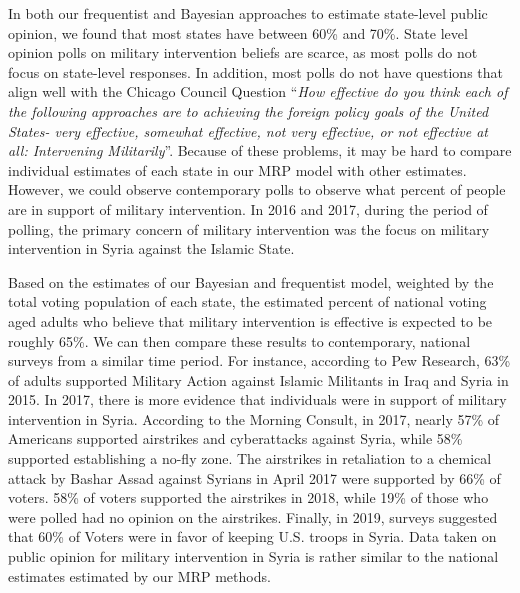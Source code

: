 \documentclass[
  11pt,
]{article}
\begin{document}
In both our frequentist and Bayesian approaches to estimate state-level
public opinion, we found that most states have between 60\% and 70\%.
State level opinion polls on military intervention beliefs are scarce,
as most polls do not focus on state-level responses. In addition, most
polls do not have questions that align well with the Chicago Council
Question ``\emph{How effective do you think each of the following
approaches are to achieving the foreign policy goals of the United
States- very effective, somewhat effective, not very effective, or not
effective at all: Intervening Militarily}''. Because of these problems,
it may be hard to compare individual estimates of each state in our MRP
model with other estimates. However, we could observe contemporary polls
to observe what percent of people are in support of military
intervention. In 2016 and 2017, during the period of polling, the
primary concern of military intervention was the focus on military
intervention in Syria against the Islamic State.

Based on the estimates of our Bayesian and frequentist model, weighted
by the total voting population of each state, the estimated percent of
national voting aged adults who believe that military intervention is
effective is expected to be roughly 65\%. We can then compare these
results to contemporary, national surveys from a similar time period.
For instance, according to Pew Research, 63\% of adults supported
Military Action against Islamic Militants in Iraq and Syria in 2015. In
2017, there is more evidence that individuals were in support of
military intervention in Syria. According to the Morning Consult, in
2017, nearly 57\% of Americans supported airstrikes and cyberattacks
against Syria, while 58\% supported establishing a no-fly zone. The
airstrikes in retaliation to a chemical attack by Bashar Assad against
Syrians in April 2017 were supported by 66\% of voters. 58\% of voters
supported the airstrikes in 2018, while 19\% of those who were polled
had no opinion on the airstrikes. Finally, in 2019, surveys suggested
that 60\% of Voters were in favor of keeping U.S. troops in Syria. Data
taken on public opinion for military intervention in Syria is rather
similar to the national estimates estimated by our MRP methods.
\end{document}
